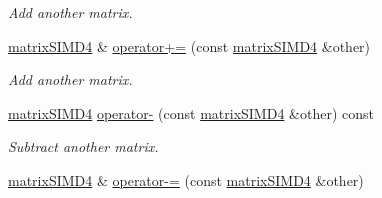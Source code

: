 \begin{DoxyCompactItemize}
\begin{DoxyCompactList}\small\item\em Add another matrix. \end{DoxyCompactList}\item 
\hyperlink{classirr_1_1core_1_1matrixSIMD4}{matrix\+S\+I\+M\+D4} \& \hyperlink{classirr_1_1core_1_1matrixSIMD4_ae1a14a97e938c067b8c01ca18e332f54}{operator+=} (const \hyperlink{classirr_1_1core_1_1matrixSIMD4}{matrix\+S\+I\+M\+D4} \&other)\hypertarget{classirr_1_1core_1_1matrixSIMD4_ae1a14a97e938c067b8c01ca18e332f54}{}\label{classirr_1_1core_1_1matrixSIMD4_ae1a14a97e938c067b8c01ca18e332f54}

\begin{DoxyCompactList}\small\item\em Add another matrix. \end{DoxyCompactList}\item 
\hyperlink{classirr_1_1core_1_1matrixSIMD4}{matrix\+S\+I\+M\+D4} \hyperlink{classirr_1_1core_1_1matrixSIMD4_afaa97a63fc1962029e850e5394c380b5}{operator-\/} (const \hyperlink{classirr_1_1core_1_1matrixSIMD4}{matrix\+S\+I\+M\+D4} \&other) const \hypertarget{classirr_1_1core_1_1matrixSIMD4_afaa97a63fc1962029e850e5394c380b5}{}\label{classirr_1_1core_1_1matrixSIMD4_afaa97a63fc1962029e850e5394c380b5}

\begin{DoxyCompactList}\small\item\em Subtract another matrix. \end{DoxyCompactList}\item 
\hyperlink{classirr_1_1core_1_1matrixSIMD4}{matrix\+S\+I\+M\+D4} \& \hyperlink{classirr_1_1core_1_1matrixSIMD4_aca267356c41bf25ff648155328483f78}{operator-\/=} (const \hyperlink{classirr_1_1core_1_1matrixSIMD4}{matrix\+S\+I\+M\+D4} \&other)\hypertarget{classirr_1_1core_1_1matrixSIMD4_aca267356c41bf25ff648155328483f78}{}\label{classirr_1_1core_1_1matrixSIMD4_aca267356c41bf25ff648155328483f78}


\end{DoxyCompactItemize}
